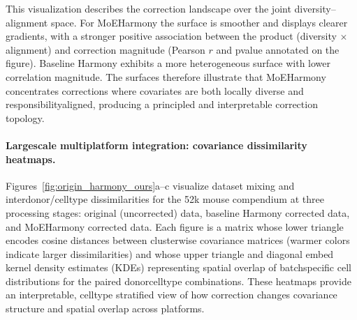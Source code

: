 \documentclass{article}
\begin{document}
This visualization describes the correction landscape over the joint diversity–alignment space. For MoE\-Harmony the surface is smoother and displays clearer gradients, with a stronger positive association between the product (diversity $\times$ alignment) and correction magnitude (Pearson $r$ and p\-value annotated on the figure). Baseline Harmony exhibits a more heterogeneous surface with lower correlation magnitude. The surfaces therefore illustrate that MoE\-Harmony concentrates corrections where covariates are both locally diverse and responsibility\-aligned, producing a principled and interpretable correction topology.

\paragraph{Large\-scale multi\-platform integration: covariance dissimilarity heatmaps.} Figures~\ref{fig:origin_harmony_ours}a--c visualize dataset mixing and inter\-donor/celltype dissimilarities for the 52k mouse compendium at three processing stages: original (uncorrected) data, baseline Harmony corrected data, and MoE\-Harmony corrected data. Each figure is a matrix whose lower triangle encodes cosine distances between cluster\-wise covariance matrices (warmer colors indicate larger dissimilarities) and whose upper triangle and diagonal embed kernel density estimates (KDEs) representing spatial overlap of batch\-specific cell distributions for the paired donor\-celltype combinations. These heatmaps provide an interpretable, cell\-type stratified view of how correction changes covariance structure and spatial overlap across platforms.
\end{document}
